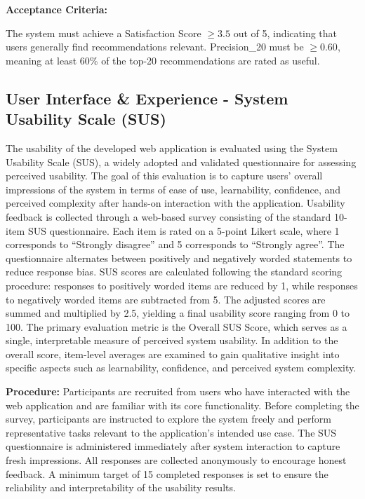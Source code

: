 \documentclass[a4paper,12pt]{report}
\begin{document}
\textbf{Acceptance Criteria:}

The system must achieve a Satisfaction Score $\ge 3.5$ out of 5, indicating that users generally find recommendations relevant. Precision\_20 must be $\ge 0.60$, meaning at least 60\% of the top-20 recommendations are rated as useful.

\subsection{User Interface \& Experience - System Usability Scale (SUS)}
The usability of the developed web application is evaluated using the System Usability Scale (SUS), a widely adopted and validated questionnaire for assessing perceived usability. The goal of this evaluation is to capture users’ overall impressions of the system in terms of ease of use, learnability, confidence, and perceived complexity after hands-on interaction with the application.
Usability feedback is collected through a web-based survey consisting of the standard 10-item SUS questionnaire. Each item is rated on a 5-point Likert scale, where 1 corresponds to “Strongly disagree” and 5 corresponds to “Strongly agree”. The questionnaire alternates between positively and negatively worded statements to reduce response bias.
SUS scores are calculated following the standard scoring procedure: responses to positively worded items are reduced by 1, while responses to negatively worded items are subtracted from 5. The adjusted scores are summed and multiplied by 2.5, yielding a final usability score ranging from 0 to 100.
The primary evaluation metric is the Overall SUS Score, which serves as a single, interpretable measure of perceived system usability. In addition to the overall score, item-level averages are examined to gain qualitative insight into specific aspects such as learnability, confidence, and perceived system complexity.

\textbf{Procedure:} Participants are recruited from users who have interacted with the web application and are familiar with its core functionality. Before completing the survey, participants are instructed to explore the system freely and perform representative tasks relevant to the application’s intended use case.
The SUS questionnaire is administered immediately after system interaction to capture fresh impressions. All responses are collected anonymously to encourage honest feedback. A minimum target of 15 completed responses is set to ensure the reliability and interpretability of the usability results.
\end{document}
